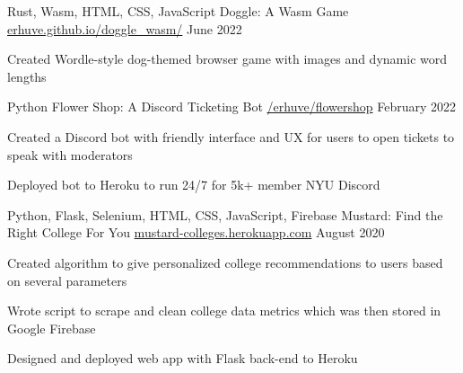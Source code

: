 

\begin{cventries}
  \cventry
    {Rust, Wasm, HTML, CSS, JavaScript} %
    {Doggle: A Wasm Game} %
    {\href{https://erhuve.github.io/doggle_wasm}{erhuve.github.io/doggle\_wasm/}} %
    {June 2022} %
    {
      \begin{cvitems} %
        \item {Created Wordle-style dog-themed browser game with images and dynamic word lengths}
      \end{cvitems}
    }
    
  \cventry
    {Python} %
    {Flower Shop: A Discord Ticketing Bot} %
    {\href{https://github.com/erhuve/flowershop}{/erhuve/flowershop}} %
    {February 2022} %
    {
      \begin{cvitems} %
        \item {Created a Discord bot with friendly interface and UX for users to open tickets to speak with moderators}
        \item {Deployed bot to Heroku to run 24/7 for 5k+ member NYU Discord}
      \end{cvitems}
    }

  \cventry
    {Python, Flask, Selenium, HTML, CSS, JavaScript, Firebase} %
    {Mustard: Find the Right College For You} %
    {\href{http://mustard-colleges.herokuapp.com/}{mustard-colleges.herokuapp.com}} %
    {August 2020} %
    {
      \begin{cvitems} %
        \item {Created algorithm to give personalized college recommendations to users based on several parameters}
        \item {Wrote script to scrape and clean college data metrics which was then stored in Google Firebase}
        \item {Designed and deployed web app with Flask back-end to Heroku}
      \end{cvitems}
    }
\end{cventries}

